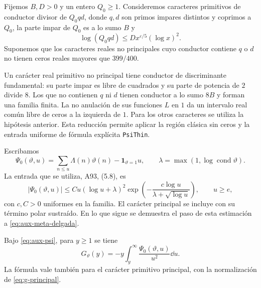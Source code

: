 Fijemos $B,D>0$ y un entero $Q_0\ge1$.
Consideremos caracteres primitivos de conductor divisor
de $Q_0qd$, donde $q,d$ son primos impares distintos y coprimos a $Q_0$,
la parte impar de $Q_0$ es a lo sumo $B$ y
\begin{equation}
 \log(Q_0qd)\le D x^{\varepsilon/5}(\log x)^2.
 \label{eq:aux-conductor-delgado}
\end{equation}
Suponemos que los caracteres reales no principales cuyo conductor
contiene $q$ o $d$ no tienen ceros reales mayores que $399/400$.

Un carácter real primitivo no principal tiene conductor de discriminante fundamental:
su parte impar es libre de cuadrados y su parte de potencia de $2$
divide $8$. Los que no contienen $q$ ni $d$ tienen conductor a lo
sumo $8B$ y forman una familia finita. La no anulación de sus funciones
$L$ en $1$ da un intervalo real común libre de ceros a la izquierda de
$1$. Para los otros caracteres se utiliza la hipótesis anterior.
Esta reducción permite aplicar la región clásica sin ceros y la entrada
uniforme de fórmula explícita \texttt{PsiThin}.

Escribamos
\[
 \Psi_0(\vartheta,u)=\sum_{n\le u}\Lambda(n)\vartheta(n)
                              -\mathbf1_{\vartheta=1}u,
 \qquad \lambda=\max(1,\log\operatorname{cond}\vartheta).
\]
La entrada que se utiliza, A93, (5.8), es
\begin{equation}
 |\Psi_0(\vartheta,u)|
 \le C u(\log u+\lambda)^2
      \exp\left(-\frac{c\log u}{\lambda+\sqrt{\log u}}\right),
 \qquad u\ge e,
 \label{eq:aux-psi}
\end{equation}
con $c,C>0$ uniformes en la familia. El carácter principal se incluye
con su término polar sustraído. En lo que sigue se demuestra el paso
de esta estimación a \eqref{eq:aux-meta-delgada}.

\begin{lema}
\label{lem:aux-integral-g}
Bajo \eqref{eq:aux-psi}, para $y\ge1$ se tiene
\begin{equation}
 G_\vartheta(y)=-y\int_y^\infty
                         \frac{\Psi_0(\vartheta,u)}{u^2}\dd u.
 \label{eq:aux-integral-g}
\end{equation}
La fórmula vale también para el carácter primitivo principal, con la
normalización de \eqref{eq:g-principal}.
\end{lema}

